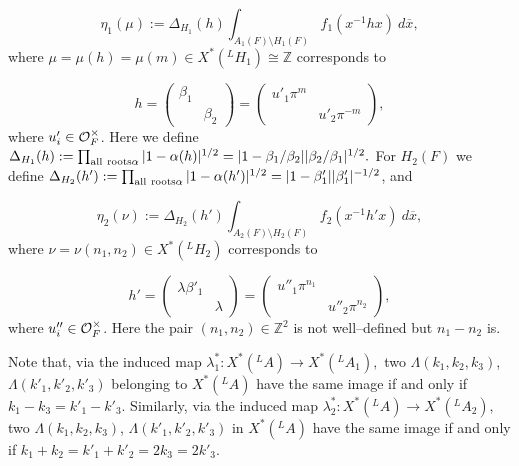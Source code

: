 \documentclass[12pt,letterpaper]{article}
\def\zzz{\mathbb{Z}}
\def\off{{\cal O}_F}
\def\ovx{\overline{x}}
\begin{document}
\begin{equation}
\label{eqn:2.9}
\eta_1 (\mu ):=\Delta_{H_1} (h)\int_{A_1(F)\setminus H_1(F)}
f_1(x^{-1}hx)\ d\ovx ,
\end{equation}
where $\mu =\mu (h)= \mu (m) \in X^*({^{L}H_1})\cong \zzz$ corresponds to

\[
h = \left( \begin{array}{cc} \beta_1&\ \\ \ &\beta_2
\end{array}
\right)
= \left( 
\begin{array}{cc}
u'_1\pi^{m}&\ \\ 
\ &u'_2\pi^{-m}
\end{array}
\right),
\]
where $u'_i\in \off^{\times}$.
Here we define $\Delta_{H_1}(h)
:=\prod_{{\rm all\  roots }\alpha }|1-\alpha (h)|^{1/2}
=|1-\beta_1/\beta_2||\beta_2/\beta_1|^{1/2}.$
For $H_2(F)$ we define $\Delta_{H_2}(h')
:=\prod_{{\rm all\  roots }\alpha }|1-\alpha (h')|^{1/2}
=|1-\beta '_1||\beta '_1|^{-1/2}$, and

\begin{equation}
\label{eqn:2.10}
\eta_2 (\nu ):=\Delta_{H_2} (h')\int_{A_2(F)\setminus H_2(F)}
f_2(x^{-1}h'x)\ d\ovx ,
\end{equation}
where $\nu = \nu (n_1,n_2) \in X^*({^{L}H_2})$ corresponds to

\[
h' = \left( 
\begin{array}{cc}
\lambda\beta '_1&\ \\ \ &\lambda
\end{array}
\right)
= \left( 
\begin{array}{cc}
u''_1\pi^{n_1}&\ \\ \ &u''_2\pi^{n_2}
\end{array}
\right) ,
\]
where
$u''_i \in \off^{\times}$. Here the pair
$(n_1,n_2) \in\zzz^2$ is not well--defined but $n_1 -n_2$ is.
 
Note that, via the induced map
$\lambda_1^* : X^*({^{L}A})\rightarrow X^*({^{L}A_1}),$
two $\Lambda (k_1,k_2,k_3)$, 
$\Lambda (k'_1,k'_2,k'_3)$ belonging to $X^*({^{L}A})$
have the same image if and only if $k_1-k_3 = k'_1-k'_3$. Similarly,
via the induced map
$\lambda_2^* : X^*({^{L}A})\rightarrow X^*({^{L}A_2}),$
two $\Lambda (k_1,k_2,k_3)$, 
$\Lambda (k'_1,k'_2,k'_3)$ in $X^*({^{L}A})$
have the same image if and only if $k_1+k_2 = k'_1+k'_2=2k_3=2k'_3$.
\end{document}
